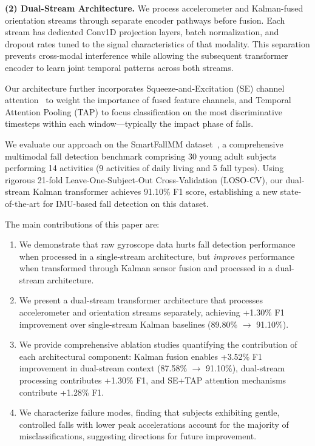\documentclass[journal,article,submit,pdftex,moreauthors]{../Definitions/mdpi}
\begin{document}
\textbf{(2) Dual-Stream Architecture.} We process accelerometer and Kalman-fused orientation streams through separate encoder pathways before fusion. Each stream has dedicated Conv1D projection layers, batch normalization, and dropout rates tuned to the signal characteristics of that modality. This separation prevents cross-modal interference while allowing the subsequent transformer encoder to learn joint temporal patterns across both streams.

Our architecture further incorporates Squeeze-and-Excitation (SE) channel attention~\cite{hu2018squeeze} to weight the importance of fused feature channels, and Temporal Attention Pooling (TAP) to focus classification on the most discriminative timesteps within each window---typically the impact phase of falls.

We evaluate our approach on the SmartFallMM dataset~\cite{ngu2022personalized}, a comprehensive multimodal fall detection benchmark comprising 30 young adult subjects performing 14 activities (9 activities of daily living and 5 fall types). Using rigorous 21-fold Leave-One-Subject-Out Cross-Validation (LOSO-CV), our dual-stream Kalman transformer achieves 91.10\% F1 score, establishing a new state-of-the-art for IMU-based fall detection on this dataset.

The main contributions of this paper are:
\begin{enumerate}
    \item We demonstrate that raw gyroscope data hurts fall detection performance when processed in a single-stream architecture, but \textit{improves} performance when transformed through Kalman sensor fusion and processed in a dual-stream architecture.
    \item We present a dual-stream transformer architecture that processes accelerometer and orientation streams separately, achieving +1.30\% F1 improvement over single-stream Kalman baselines (89.80\% $\rightarrow$ 91.10\%).
    \item We provide comprehensive ablation studies quantifying the contribution of each architectural component: Kalman fusion enables +3.52\% F1 improvement in dual-stream context (87.58\% $\rightarrow$ 91.10\%), dual-stream processing contributes +1.30\% F1, and SE+TAP attention mechanisms contribute +1.28\% F1.
    \item We characterize failure modes, finding that subjects exhibiting gentle, controlled falls with lower peak accelerations account for the majority of misclassifications, suggesting directions for future improvement.
\end{enumerate}
\end{document}
